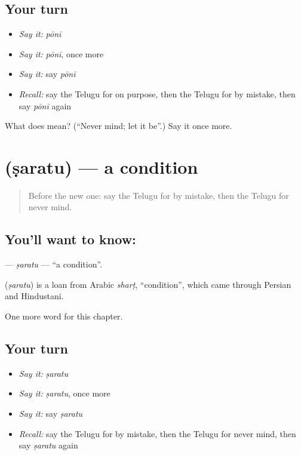 \subsection*{Your turn}
\begin{itemize}
\raggedright
  \item \emph{Say it:} \emph{pōnī}
  \item \emph{Say it:} \emph{pōnī}, once more
  \item \emph{Say it:} say \emph{pōnī}
  \item \emph{Recall:} say the Telugu for on purpose, then the Telugu for by mistake, then say \emph{pōnī} again
\end{itemize}

\begin{tcolorbox}[breakable,colback=teal!4,colframe=teal!35!black,title={Before you move on}]
What does  mean? (\textquotedblleft{}Never mind; let it be\textquotedblright{}.) Say it once more.
\end{tcolorbox}
\section[\texorpdfstring{\te{షరతు} (ṣaratu)}{షరతు (ṣaratu)}]{ (ṣaratu) — a condition}

\label{lesson:TE-C178-saratu}



\begin{quote}
Before the new one: say the Telugu for by mistake, then the Telugu for never mind.
\end{quote}

\subsection*{You'll want to know: }
\textbf{} — \emph{ṣaratu} — \textquotedblleft{}a condition\textquotedblright{}.

\begin{cousinweb}
\textbf{} (\emph{ṣaratu}) is a loan from Arabic \emph{sharṭ}, \textquotedblleft{}condition\textquotedblright{}, which came through Persian and Hindustani.
\end{cousinweb}

\begin{grammarlens}[title={What you've built}]
One more word for this chapter.
\end{grammarlens}

\subsection*{Your turn}
\begin{itemize}
\raggedright
  \item \emph{Say it:} \emph{ṣaratu}
  \item \emph{Say it:} \emph{ṣaratu}, once more
  \item \emph{Say it:} say \emph{ṣaratu}
  \item \emph{Recall:} say the Telugu for by mistake, then the Telugu for never mind, then say \emph{ṣaratu} again
\end{itemize}

